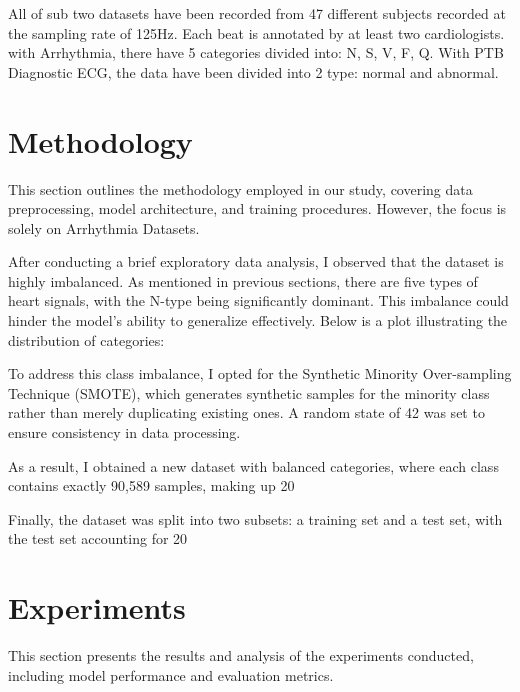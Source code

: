 \documentclass[10pt, conference]{IEEEtran}
\begin{document}
	\par All of sub two datasets have been recorded from 47
	different subjects recorded at the sampling rate of 125Hz.
	Each beat is annotated by at least two cardiologists. with Arrhythmia, there have 5 categories divided into: N, S, V, F, Q.
	With PTB Diagnostic ECG, the data have been divided into 2 type: normal and abnormal.
	
	\section{Methodology}
This section outlines the methodology employed in our study, covering data preprocessing, model architecture, and training procedures. However, the focus is solely on Arrhythmia Datasets.

\par After conducting a brief exploratory data analysis, I observed that the dataset is highly imbalanced. As mentioned in previous sections, there are five types of heart signals, with the N-type being significantly dominant. This imbalance could hinder the model's ability to generalize effectively. Below is a plot illustrating the distribution of categories:

\par To address this class imbalance, I opted for the Synthetic Minority Over-sampling Technique (SMOTE), which generates synthetic samples for the minority class rather than merely duplicating existing ones. A random state of 42 was set to ensure consistency in data processing.

\par As a result, I obtained a new dataset with balanced categories, where each class contains exactly 90,589 samples, making up 20%

\par Finally, the dataset was split into two subsets: a training set and a test set, with the test set accounting for 20%
	
	\section{Experiments}
	This section presents the results and analysis of the experiments conducted, including model performance and evaluation metrics.
\end{document}

